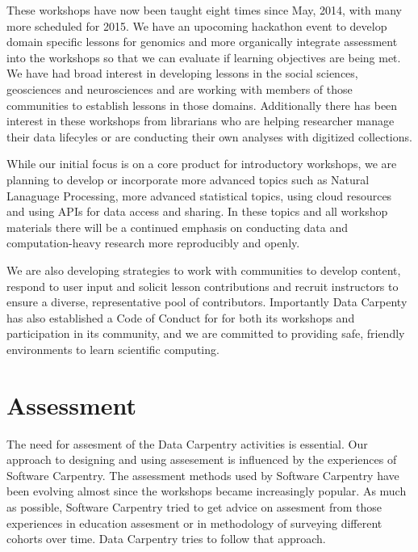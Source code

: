 \documentclass[15]{idcc}
\begin{document}
\begin{itemize}
These workshops have now been taught eight times since May, 2014, with many more scheduled for 2015. We have an
  upocoming hackathon event to develop domain specific lessons for genomics and more organically integrate assessment
  into the workshops so that we can evaluate if learning objectives are being met. We have had broad interest in developing lessons
  in the social sciences, geosciences and neurosciences and are working with members of those communities to establish lessons in those
  domains. Additionally there has been interest in these workshops from librarians who are helping researcher manage their data lifecyles
 or are conducting their own analyses with digitized collections.

 While our initial focus is on a core product for introductory workshops, we are planning to develop or incorporate more advanced topics
 such as Natural Lanaguage Processing, more advanced statistical topics, using cloud resources and using APIs for data access and sharing. In these topics and all workshop materials there will be a continued emphasis on conducting data and computation-heavy research more reproducibly and openly.


 We are also developing strategies to work with communities to develop content, respond to user input and solicit lesson contributions and recruit instructors to ensure a diverse, representative pool of contributors. Importantly Data Carpenty has also established a Code of Conduct for
 for both its workshops and participation in its community, and we are committed to providing safe, friendly environments to learn scientific computing.




\section{Assessment}
The need for assesment of the Data Carpentry activities is essential. Our approach to designing and using assesement is influenced by
the experiences of Software Carpentry. The assessment methods used by Software Carpentry have been evolving almost since the workshops became 
increasingly popular. As much as possible, Software Carpentry tried to get advice on assesment from those experiences in education assesment or 
in methodology of surveying different cohorts over time. Data Carpentry tries to follow that approach. \\


\end{itemize}
\end{document}
